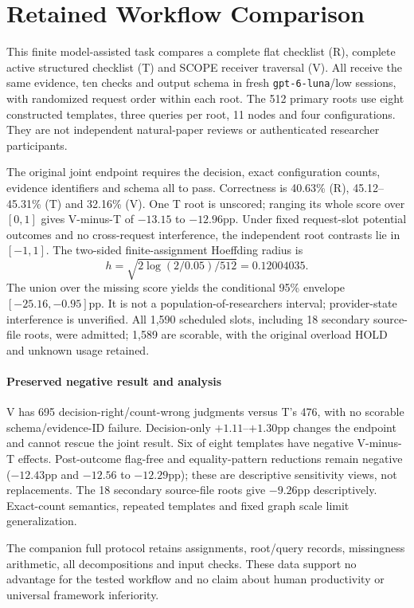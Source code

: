 \section{Retained Workflow Comparison}\label{app:scope-workflow-boundary}
This finite model-assisted task compares a complete flat checklist (R), complete active structured checklist (T) and SCOPE receiver traversal (V). All receive the same evidence, ten checks and output schema in fresh \texttt{gpt-6-luna}/low sessions, with randomized request order within each root. The 512 primary roots use eight constructed templates, three queries per root, 11 nodes and four configurations. They are not independent natural-paper reviews or authenticated researcher participants.

The original joint endpoint requires the decision, exact configuration counts, evidence identifiers and schema all to pass. Correctness is 40.63\% (R), 45.12--45.31\% (T) and 32.16\% (V). One T root is unscored; ranging its whole score over $[0,1]$ gives V-minus-T of $-13.15$ to $-12.96$pp. Under fixed request-slot potential outcomes and no cross-request interference, the independent root contrasts lie in $[-1,1]$. The two-sided finite-assignment Hoeffding radius is
\[
h=\sqrt{2\log(2/0.05)/512}=0.12004035.
\]
The union over the missing score yields the conditional 95\% envelope $[-25.16,-0.95]$pp. It is not a population-of-researchers interval; provider-state interference is unverified. All 1,590 scheduled slots, including 18 secondary source-file roots, were admitted; 1,589 are scorable, with the original overload HOLD and unknown usage retained.

\paragraph{Preserved negative result and analysis}
V has 695 decision-right/count-wrong judgments versus T's 476, with no scorable schema/evidence-ID failure. Decision-only $+1.11$--$+1.30$pp changes the endpoint and cannot rescue the joint result. Six of eight templates have negative V-minus-T effects. Post-outcome flag-free and equality-pattern reductions remain negative ($-12.43$pp and $-12.56$ to $-12.29$pp); these are descriptive sensitivity views, not replacements. The 18 secondary source-file roots give $-9.26$pp descriptively. Exact-count semantics, repeated templates and fixed graph scale limit generalization.

The companion full protocol retains assignments, root/query records, missingness arithmetic, all decompositions and input checks. These data support no advantage for the tested workflow and no claim about human productivity or universal framework inferiority.
